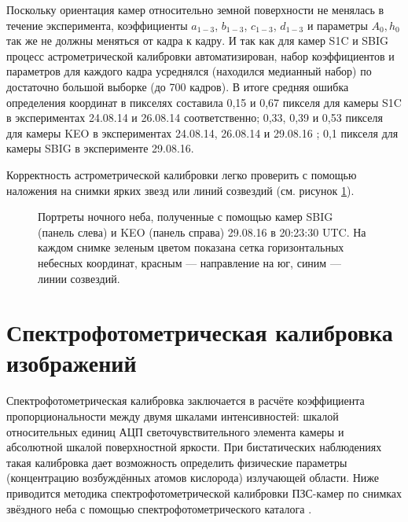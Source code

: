 \documentclass[12pt,a4paper]{article}
\begin{document}
Поскольку ориентация камер относительно земной поверхности не менялась в течение эксперимента, коэффициенты $a_{1-3}$, $b_{1-3}$, $c_{1-3}$, $d_{1-3}$ и параметры $A_0, h_0$ так же не должны меняться от кадра к кадру. И так как для камер S1C и SBIG процесс астрометрической калибровки автоматизирован, набор коэффициентов и параметров для каждого кадра усреднялся (находился медианный набор) по достаточно большой выборке (до 700 кадров). В итоге средняя ошибка определения координат в пикселях составила 0,15 и 0,67 пикселя для камеры S1C в экспериментах 24.08.14 и 26.08.14 соответственно; 0,33, 0,39 и 0,53 пикселя для камеры KEO в экспериментах 24.08.14, 26.08.14 и 29.08.16 ; 0,1 пикселя для камеры SBIG в эксперименте 29.08.16.

Корректность астрометрической калибровки легко проверить с помощью наложения на снимки ярких звезд или линий созвездий (см. рисунок \ref{fig:fig2}).


\begin{figure}[h]
	\caption{Портреты ночного неба, полученные с помощью камер SBIG (панель слева) и KEO (панель справа) 29.08.16 в 20:23:30 UTC. На каждом снимке зеленым цветом показана сетка горизонтальных небесных координат, красным --- направление на юг, синим --- линии созвездий.}
	\label{fig:fig2}
\end{figure}


\section{Спектрофотометрическая калибровка изображений} \label{sec:spectro_cal}
Спектрофотометрическая калибровка заключается в расчёте коэффициента пропорциональности между двумя шкалами интенсивностей: шкалой относительных единиц АЦП светочувствительного элемента камеры и абсолютной шкалой поверхностной яркости. При бистатических наблюдениях такая калибровка дает возможность определить физические параметры (концентрацию возбуждённых атомов кислорода) излучающей области. Ниже приводится методика спектрофотометрической калибровки ПЗС-камер по снимках звёздного неба с помощью спектрофотометрического каталога \cite{Kharitonov1978}.
\end{document}
